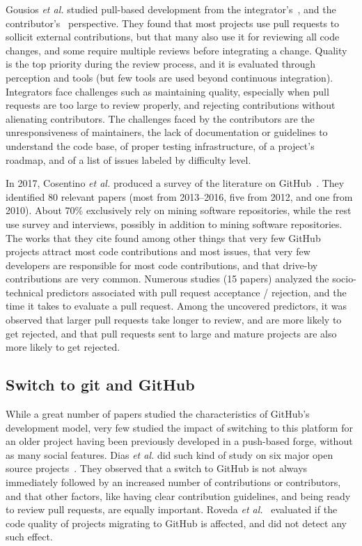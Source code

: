 Gousios \emph{et al.} studied pull-based development from the integrator's~\cite{gousios2015work}, and the contributor's~\cite{gousios2016work} perspective. They found that most projects use pull requests to sollicit external contributions, but that many also use it for reviewing all code changes, and some require multiple reviews before integrating a change. Quality is the top priority during the review process, and it is evaluated through perception and tools (but few tools are used beyond continuous integration). Integrators face challenges such as maintaining quality, especially when pull requests are too large to review properly, and rejecting contributions without alienating contributors. The challenges faced by the contributors are the unresponsiveness of maintainers, the lack of documentation or guidelines to understand the code base, of proper testing infrastructure, of a project's roadmap, and of a list of issues labeled by difficulty level.

In 2017, Cosentino \emph{et al.} produced a survey of the literature on GitHub~\cite{cosentino2017systematic}. They identified 80 relevant papers (most from 2013--2016, five from 2012, and one from 2010). About 70\% exclusively rely on mining software repositories, while the rest use survey and interviews, possibly in addition to mining software repositories. The works that they cite found among other things that very few GitHub projects attract most code contributions and most issues, that very few developers are responsible for most code contributions, and that drive-by contributions are very common. Numerous studies (15 papers) analyzed the socio-technical predictors associated with pull request acceptance / rejection, and the time it takes to evaluate a pull request. Among the uncovered predictors, it was observed that larger pull requests take longer to review, and are more likely to get rejected, and that pull requests sent to large and mature projects are also more likely to get rejected.

\subsection{Switch to git and GitHub}

While a great number of papers studied the characteristics of GitHub's development model, very few studied the impact of switching to this platform for an older project having been previously developed in a push-based forge, without as many social features. Dias \emph{et al.} did such kind of study on six major open source projects~\cite{dias2016does}. They observed that a switch to GitHub is not always immediately followed by an increased number of contributions or contributors, and that other factors, like having clear contribution guidelines, and being ready to review pull requests, are equally important.
Roveda \emph{et al.}~\cite{roveda2017does} evaluated if the code quality of projects migrating to GitHub is affected, and did not detect any such effect.

